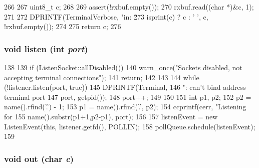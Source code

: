 \begin{DoxyCode}
266 {
267     uint8_t c;
268 
269     assert(!rxbuf.empty());
270     rxbuf.read((char *)&c, 1);
271 
272     DPRINTF(TerminalVerbose, "in: \'%
273             isprint(c) ? c : ' ', c, !rxbuf.empty());
274 
275     return c;
276 }
\end{DoxyCode}
\hypertarget{classTerminal_ac0c44c1417536740ffc2cf33117027cf}{
\subsubsection[{listen}]{\setlength{\rightskip}{0pt plus 5cm}void listen (int {\em port})}}
\label{classTerminal_ac0c44c1417536740ffc2cf33117027cf}



\begin{DoxyCode}
138 {
139     if (ListenSocket::allDisabled()) {
140         warn_once("Sockets disabled, not accepting terminal connections");
141         return;
142     }
143 
144     while (!listener.listen(port, true)) {
145         DPRINTF(Terminal,
146                 ": can't bind address terminal port %
147                 port, getpid());
148         port++;
149     }
150 
151     int p1, p2;
152     p2 = name().rfind('.') - 1;
153     p1 = name().rfind('.', p2);
154     ccprintf(cerr, "Listening for %
155             name().substr(p1+1,p2-p1), port);
156 
157     listenEvent = new ListenEvent(this, listener.getfd(), POLLIN);
158     pollQueue.schedule(listenEvent);
159 }
\end{DoxyCode}
\hypertarget{classTerminal_acc9adc1d382d03684010f95ae14318d4}{
\subsubsection[{out}]{\setlength{\rightskip}{0pt plus 5cm}void out (char {\em c})}}
\label{classTerminal_acc9adc1d382d03684010f95ae14318d4}



